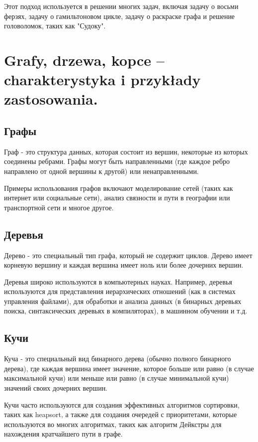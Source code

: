 Этот подход используется в решении многих задач, включая задачу о восьми ферзях, задачу о гамильтоновом цикле, задачу о раскраске графа и решение головоломок, таких как "Судоку".


\section{Grafy, drzewa, kopce – charakterystyka i przykłady zastosowania.}

\subsection*{Графы}

Граф - это структура данных, которая состоит из вершин, некоторые из которых соединены ребрами. Графы могут быть направленными (где каждое ребро направлено от одной вершины к другой) или ненаправленными. 

Примеры использования графов включают моделирование сетей (таких как интернет или социальные сети), анализ связности и пути в географии или транспортной сети и многое другое.

\subsection*{Деревья}

Дерево - это специальный тип графа, который не содержит циклов. Дерево имеет корневую вершину и каждая вершина имеет ноль или более дочерних вершин. 

Деревья широко используются в компьютерных науках. Например, деревья используются для представления иерархических отношений (как в системах управления файлами), для обработки и анализа данных (в бинарных деревьях поиска, синтаксических деревьях в компиляторах), в машинном обучении и т.д.

\subsection*{Кучи}

Куча - это специальный вид бинарного дерева (обычно полного бинарного дерева), где каждая вершина имеет значение, которое больше или равно (в случае максимальной кучи) или меньше или равно (в случае минимальной кучи) значений своих дочерних вершин.

Кучи часто используются для создания эффективных алгоритмов сортировки, таких как heapsort, а также для создания очередей с приоритетами, которые используются во многих алгоритмах, таких как алгоритм Дейкстры для нахождения кратчайшего пути в графе.



